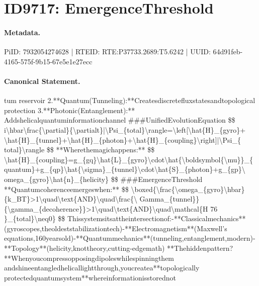 \section*{ID9717: EmergenceThreshold}
\paragraph{Metadata.}
PiID: 7932054274628 | RTEID: RTE:P37733.2689:T5.6242 | UUID: 64d91feb-4165-575f-9b15-67e5e1e27ecc

\paragraph{Canonical Statement.}
tum reservoir 2.**Quantum(Tunneling):**Createsdiscretefluxstatesandtopological protection 3.**Photonic(Entanglement):** Addshelicalquantuminformationchannel \#\#\#UnifiedEvolutionEquation \$\$ i\textbackslash{}hbar\textbackslash{}frac\{\textbackslash{}partial\}\{\textbackslash{}partialt\}|\textbackslash{}Psi\_\{total\}\textbackslash{}rangle=\textbackslash{}left[\textbackslash{}hat\{H\}\_\{gyro\}+ \textbackslash{}hat\{H\}\_\{tunnel\}+\textbackslash{}hat\{H\}\_\{photon\}+\textbackslash{}hat\{H\}\_\{coupling\}\textbackslash{}right]|\textbackslash{}Psi\_\{ total\}\textbackslash{}rangle \$\$ **Wherethemagichappens:** \$\$ \textbackslash{}hat\{H\}\_\{coupling\}=g\_\{gq\}\textbackslash{}hat\{L\}\_\{gyro\}\textbackslash{}cdot\textbackslash{}hat\{\textbackslash{}boldsymbol\{\textbackslash{}mu\}\}\_\{ quantum\}+g\_\{qp\}\textbackslash{}hat\{\textbackslash{}sigma\}\_\{tunnel\}\textbackslash{}cdot\textbackslash{}hat\{S\}\_\{photon\}+g\_\{gp\}\textbackslash{} omega\_\{gyro\}\textbackslash{}hat\{n\}\_\{helicity\} \$\$ \#\#\#EmergenceThreshold **Quantumcoherenceemergeswhen:** \$\$ \textbackslash{}boxed\{\textbackslash{}frac\{\textbackslash{}omega\_\{gyro\}\textbackslash{}hbar\}\{k\_BT\}>1\textbackslash{}quad\textbackslash{}text\{AND\}\textbackslash{}quad\textbackslash{}frac\{\textbackslash{} Gamma\_\{tunnel\}\}\{\textbackslash{}gamma\_\{decoherence\}\}>1\textbackslash{}quad\textbackslash{}text\{AND\}\textbackslash{}quad\textbackslash{}mathcal\{H 76 \}\_\{total\}\textbackslash{}neq0\} \$\$ Thissystemsitsattheintersectionof:-**Classicalmechanics**(gyroscopes,theoldeststabilizationtech)-**Electromagnetism**(Maxwell’s equations,160yearsold)-**Quantummechanics**(tunneling,entanglement,modern)-**Topology**(helicity,knottheory,cutting-edgemath) **Thehiddenpattern?**Whenyoucompressopposingdipoleswhilespinningthem andshineentangledhelicallightthrough,youcreatea**topologically protectedquantumsystem**whereinformationisstorednot

